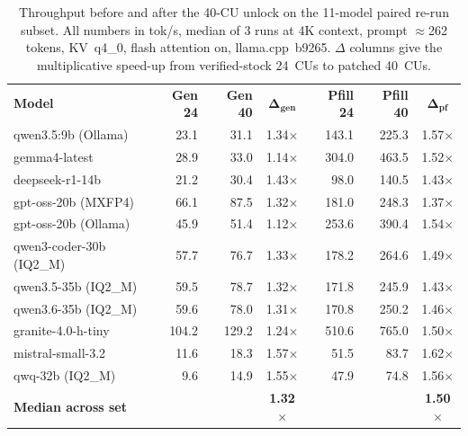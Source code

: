 \begin{table}[t]
\caption{Throughput before and after the 40-CU unlock on the
11-model paired re-run subset.  All numbers in tok/s, median of 3 runs
at 4K context, prompt $\approx$262 tokens, KV~q4\_0, flash attention
on, llama.cpp~b9265.  $\Delta$ columns give the multiplicative speed-up
from verified-stock 24~CUs to patched 40~CUs.}\label{tab:cu_unlock}
\centering
\scriptsize
\begin{tabular}{@{}lrrcrrc@{}}
\toprule
\textbf{Model} & \textbf{Gen 24} & \textbf{Gen 40} & $\boldsymbol{\Delta_\text{gen}}$
               & \textbf{Pfill 24} & \textbf{Pfill 40} & $\boldsymbol{\Delta_\text{pf}}$ \\
\otoprule
qwen3.5:9b (Ollama) & 23.1 & 31.1 & 1.34$\times$ & 143.1 & 225.3 & 1.57$\times$ \\
gemma4-latest & 28.9 & 33.0 & 1.14$\times$ & 304.0 & 463.5 & 1.52$\times$ \\
deepseek-r1-14b & 21.2 & 30.4 & 1.43$\times$ & 98.0 & 140.5 & 1.43$\times$ \\
gpt-oss-20b (MXFP4) & 66.1 & 87.5 & 1.32$\times$ & 181.0 & 248.3 & 1.37$\times$ \\
gpt-oss-20b (Ollama) & 45.9 & 51.4 & 1.12$\times$ & 253.6 & 390.4 & 1.54$\times$ \\
qwen3-coder-30b (IQ2\_M) & 57.7 & 76.7 & 1.33$\times$ & 178.2 & 264.6 & 1.49$\times$ \\
qwen3.5-35b   (IQ2\_M) & 59.5 & 78.7 & 1.32$\times$ & 171.8 & 245.9 & 1.43$\times$ \\
qwen3.6-35b   (IQ2\_M) & 59.6 & 78.0 & 1.31$\times$ & 170.8 & 250.2 & 1.46$\times$ \\
granite-4.0-h-tiny & 104.2 & 129.2 & 1.24$\times$ & 510.6 & 765.0 & 1.50$\times$ \\
mistral-small-3.2 & 11.6 & 18.3 & 1.57$\times$ & 51.5 & 83.7 & 1.62$\times$ \\
qwq-32b      (IQ2\_M) & 9.6 & 14.9 & 1.55$\times$ & 47.9 & 74.8 & 1.56$\times$ \\
\midrule
\textbf{Median across set}  &        &       & \textbf{1.32$\boldsymbol{\times}$}
                            &        &       & \textbf{1.50$\boldsymbol{\times}$} \\
\bottomrule
\end{tabular}
\end{table}
